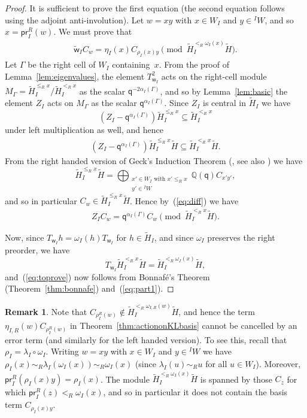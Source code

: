 \documentclass[11pt]{article}
\theoremstyle{plain}
\theoremstyle{definition}
\newtheorem{remark}[thm]{Remark}
\numberwithin{equation}{section}
\def\pr{\mathsf{pr}}
\def\tw{\widetilde{\mathsf{w}}_I}
\newcommand{\la}{\lambda}
\newcommand{\Ga}{\Gamma}
\def\QQ{\mathbb{Q}}
\def\la{\lambda}
\def\la{\lambda}
\newcommand{\sw}{\mathsf{w}}
\newcommand{\sq}{\mathsf{q}}
\begin{document}
\begin{proof}
It is sufficient to prove the first equation (the second equation follows using the adjoint anti-involution). Let $w=xy$ with $x\in W_I$ and $y\in {^I}W$, and so $x=\pr_I^R(w)$. We must prove that
\begin{align}\label{eq:toprove}
\tw C_w=\eta_I(x)C_{\rho_I(x)y}\pmod{\tilde{H}_I^{<_R\omega_I(x)}\tilde{H}}.
\end{align}
Let $\Ga$ be the right cell of $W_I$ containing~$x$. From the proof of Lemma~\ref{lem:eigenvalues}, the element $T_{\sw_I}^2$ acts on the right-cell module $M_{\Ga}=\tilde{H}_I^{\leq_R x}/\tilde{H}_I^{<_R x}$ as the scalar $\sq^{-2\alpha_I(\Ga)}$, and so by Lemma~\ref{lem:basic} the element $Z_I$ acts on $M_{\Ga}$ as the scalar $\sq^{\alpha_I(\Ga)}$. Since $Z_I$ is central in $\tilde{H}_I$ we have 
$$
(Z_I-\sq^{\alpha_I(\Ga)})\tilde{H}_I^{\leq_Rx}\subseteq \tilde{H}_I^{<_Rx}
$$
under left multiplication as well, and hence 
\begin{align}\label{eq:diff}
(Z_I-\sq^{\alpha_I(\Ga)})\tilde{H}_I^{\leq_Rx}\tilde{H}\subseteq \tilde{H}_I^{<_Rx}\tilde{H}. 
\end{align}
From the right handed version of Geck's Induction Theorem (\cite{Ge:03}, see also \cite[Theorem~1.3]{Bon:16}) we have 
$$
\tilde{H}_I^{\leq_Rx}\tilde{H}=\bigoplus_{\substack{x'\in W_I\text{ with }x'\leq_Rx\\
y'\in {^I}W}}\QQ(\sq)C_{x'y'},
$$
and so in particular $C_w\in \tilde{H}_I^{\leq_Rx}\tilde{H}$. Hence by~(\ref{eq:diff}) we have
\begin{align}\label{eq:part1}
Z_IC_w=\sq^{\alpha_I(\Ga)}C_w\pmod{\tilde{H}_I^{<_Rx}\tilde{H}}. 
\end{align}

Now, since $T_{\sw_I}h=\omega_I(h)T_{\sw_I}$ for $h\in\tilde{H}_I$, and since $\omega_I$ preserves the right preorder, we have 
$$
T_{\sw_I}\tilde{H}_I^{<_R x}\tilde{H}=\tilde{H}_I^{<_R\omega_I(x)}\tilde{H},
$$
and~(\ref{eq:toprove}) now follows from Bonnaf\'e's Theorem (Theorem~\ref{thm:bonnafe}) and~(\ref{eq:part1}).
\end{proof}



\begin{remark}\label{rem:nokill}
Note that $C_{\rho_I^R(w)}\notin \tilde{H}_I^{<_R\omega_{I,R}(w)}\tilde{H}$, and hence the term $\eta_{I,R}(w)C_{\rho_I^R(w)}$ in Theorem~\ref{thm:actiononKLbasis} cannot be cancelled by an error term (and similarly for the left handed version). To see this, recall that $\rho_I=\la_I\circ\omega_I$. Writing $w=xy$ with $x\in W_I$ and $y\in {^I}W$ we have $\rho_I(x)\sim_R\la_I(\omega_I(x))\sim_R\omega_I(x)$ (since $\la_I(u)\sim_R u$ for all $u\in W_I$). Moreover, $\pr_I^R(\rho_I(x)y)=\rho_I(x)$. The module $\tilde{H}_I^{<_R\omega_I(x)}\tilde{H}$ is spanned by those $C_z$ for which $\pr_I^R(z)<_R\omega_I(x)$, and so in particular it does not contain the basis term $C_{\rho_I(x)y}$. 
\end{remark}
\end{document}
